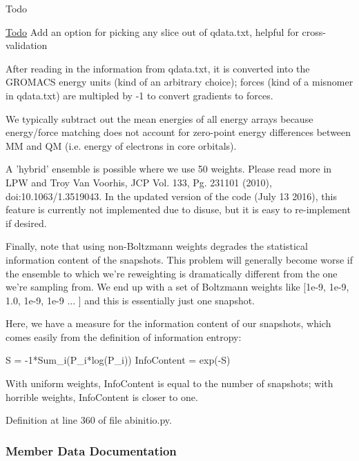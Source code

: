 \begin{DoxyRefDesc}{Todo}
\item[\hyperlink{todo__todo000002}{Todo}]Add an option for picking any slice out of qdata.\+txt, helpful for cross-\/validation\end{DoxyRefDesc}
\begin{DoxyVerb}     After reading in the information from qdata.txt, it is converted
     into the GROMACS energy units (kind of an arbitrary choice);
     forces (kind of a misnomer in qdata.txt) are multipled by -1
     to convert gradients to forces.

     We typically subtract out the mean energies of all energy arrays
     because energy/force matching does not account for zero-point
     energy differences between MM and QM (i.e. energy of electrons
     in core orbitals).

     A 'hybrid' ensemble is possible where we use 50%
     weights.  Please read more in LPW and Troy Van Voorhis, JCP
     Vol. 133, Pg. 231101 (2010), doi:10.1063/1.3519043.  In the
     updated version of the code (July 13 2016), this feature is
     currently not implemented due to disuse, but it is easy to
     re-implement if desired.

     Finally, note that using non-Boltzmann weights degrades the
     statistical information content of the snapshots.  This
     problem will generally become worse if the ensemble to which
     we're reweighting is dramatically different from the one we're
     sampling from.  We end up with a set of Boltzmann weights like
     [1e-9, 1e-9, 1.0, 1e-9, 1e-9 ... ] and this is essentially just
     one snapshot.

     Here, we have a measure for the information content of our snapshots,
     which comes easily from the definition of information entropy:

     S = -1*Sum_i(P_i*log(P_i))
     InfoContent = exp(-S)

     With uniform weights, InfoContent is equal to the number of snapshots;
     with horrible weights, InfoContent is closer to one.\end{DoxyVerb}
 

Definition at line 360 of file abinitio.\+py.



\subsubsection{Member Data Documentation}
\mbox{\label{classsrc_1_1abinitio_1_1AbInitio_a472fb76548806e05b499d97c17776a33}} 
